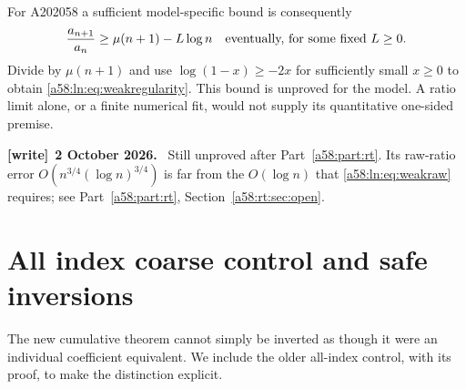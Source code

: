 \documentclass[11pt,letterpaper]{article}
\theoremstyle{remark}
\newenvironment{writenote}[1][]{\par\smallskip\begingroup\small
 \noindent\textbf{[write]}\if\relax\detokenize{#1}\relax\else~\textbf{#1.}\fi\ }%
 {\par\endgroup\smallskip}
\begin{document}
For A202058 a sufficient model-specific bound is consequently
\begin{equation}\label{a58:ln:eq:weakraw}
 \frac{a_{n+1}}{a_n}\ge\mu(n+1)-L\log n
 \quad\hbox{eventually, for some fixed }L\ge0.
\end{equation}
Divide by $\mu(n+1)$ and use $\log(1-x)\ge-2x$ for sufficiently small
$x\ge0$ to obtain \eqref{a58:ln:eq:weakregularity}. This bound is unproved for
the model. A ratio limit alone, or a finite numerical fit, would not
supply its quantitative one-sided premise.
\begin{writenote}[2 October 2026]
Still unproved after Part~\ref{a58:part:rt}. Its raw-ratio error $O(n^{3/4}(\log n)^{3/4})$ is far from the $O(\log n)$ that \eqref{a58:ln:eq:weakraw} requires; see Part~\ref{a58:part:rt}, Section~\ref{a58:rt:sec:open}.
\end{writenote}

\section{All index coarse control and safe inversions}\label{a58:ln:sec:inverse}
The new cumulative theorem cannot simply be inverted as though it
were an individual coefficient equivalent. We include the older
all-index control, with its proof, to make the distinction explicit.
\end{document}
